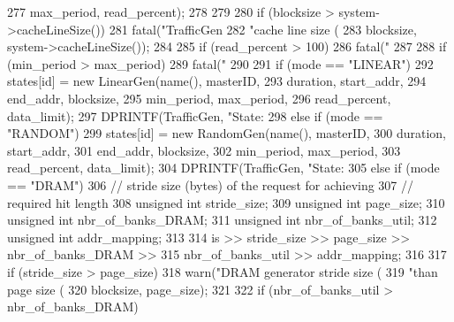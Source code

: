 \begin{DoxyCode}
{{{{{277                             max_period, read_percent);
278 
279 
280                     if (blocksize > system->cacheLineSize())
281                         fatal("TrafficGen %
282                               "cache line size (%
283                               blocksize, system->cacheLineSize());
284 
285                     if (read_percent > 100)
286                         fatal("%
287 
288                     if (min_period > max_period)
289                         fatal("%
290 
291                     if (mode == "LINEAR") {
292                         states[id] = new LinearGen(name(), masterID,
293                                                    duration, start_addr,
294                                                    end_addr, blocksize,
295                                                    min_period, max_period,
296                                                    read_percent, data_limit);
297                         DPRINTF(TrafficGen, "State: %
298                     } else if (mode == "RANDOM") {
299                         states[id] = new RandomGen(name(), masterID,
300                                                    duration, start_addr,
301                                                    end_addr, blocksize,
302                                                    min_period, max_period,
303                                                    read_percent, data_limit);
304                         DPRINTF(TrafficGen, "State: %
305                     } else if (mode == "DRAM") {
306                         // stride size (bytes) of the request for achieving
307                         // required hit length
308                         unsigned int stride_size;
309                         unsigned int page_size;
310                         unsigned int nbr_of_banks_DRAM;
311                         unsigned int nbr_of_banks_util;
312                         unsigned int addr_mapping;
313 
314                         is >> stride_size >> page_size >> nbr_of_banks_DRAM >>
315                             nbr_of_banks_util >> addr_mapping;
316 
317                         if (stride_size > page_size)
318                             warn("DRAM generator stride size (%
319                                  "than page size (%
320                                  blocksize, page_size);
321 
322                         if (nbr_of_banks_util > nbr_of_banks_DRAM)
}}}}}}
\end{DoxyCode}

